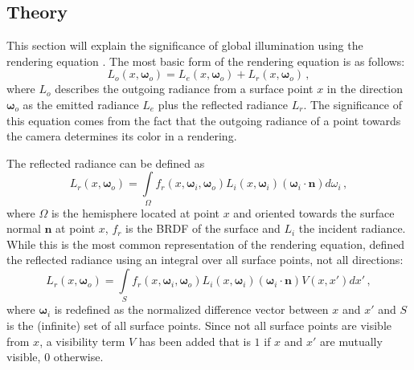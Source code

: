 \subsection{Theory}
\label{sec:intro:gi:theory}


\newcommand{\dir}{\bm{\omega}} %

\newcommand{\outgoingDir}{ \dir_o}
\newcommand{\incidenceDir}{\dir_i}

\newcommand{\outgoingRadiance}{  L_o(x, \outgoingDir)}
\newcommand{\emittedRadiance}{   L_e(x, \outgoingDir)}
\newcommand{\reflectedRadiance}{ L_r(x, \outgoingDir)}
\newcommand{\incidentRadiance}{  L_i(x, \incidenceDir)}

\newcommand{\brdf}{f_r} %

\newcommand{\surfaceNormal}{\bm{n}}

This section will explain the significance of global illumination using the rendering equation \citep{Kajiya:1986:RenderingEquation}. The most basic form of the rendering equation is as follows:
%
\begin{equation}
\outgoingRadiance = \emittedRadiance + \reflectedRadiance\,,
\label{eq:renderBasic}
\end{equation}
%
where $L_o$ describes the outgoing radiance from a surface point $x$ in the direction $\outgoingDir$ as the emitted radiance $L_e$ plus the reflected radiance $L_r$. The significance of this equation comes from the fact that the outgoing radiance of a point towards the camera determines its color in a rendering.

The reflected radiance can be defined as
%
\begin{equation}
\reflectedRadiance = \int\limits_{\Omega} \brdf(x, \incidenceDir, \outgoingDir)\incidentRadiance (\incidenceDir \cdot \surfaceNormal) d \omega_i\,,
\label{eq:render}
\end{equation}
%
where $\Omega$ is the hemisphere located at point $x$ and oriented towards the surface normal $\surfaceNormal$ at point $x$, $\brdf$ is the BRDF of the surface and $L_i$ the incident radiance. While this is the most common representation of the rendering equation, \citet{Kajiya:1986:RenderingEquation} defined the reflected radiance using an integral over all surface points, not all directions:
%
  \begin{equation}
    \reflectedRadiance = \int\limits_{S} \brdf(x, \incidenceDir, \outgoingDir) \incidentRadiance (\incidenceDir \cdot \surfaceNormal) V(x, x') d x'\,,
  \label{eq:renderWithVisibility}
  \end{equation}
%
where $\incidenceDir$ is redefined as the normalized difference vector between $x$ and $x'$ and $S$ is the (infinite) set of all surface points. Since not all surface points are visible from $x$, a visibility term $V$ has been added that is $1$ if $x$ and $x'$ are mutually visible, $0$ otherwise.

